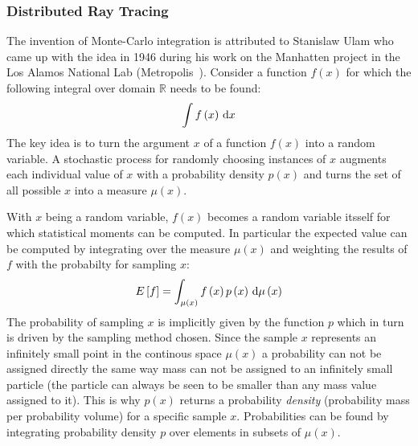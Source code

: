 \subsubsection*{Distributed Ray Tracing}

The invention of Monte-Carlo integration is attributed to Stanislaw Ulam who came up with the idea in 1946 during his work on the Manhatten project in the Los Alamos National Lab (Metropolis~\cite{Metropolis49, Metropolis87}). Consider a function $f\left(x\right)$ for which the following integral over domain $\mathbb{R}$ needs to be found:
\begin{align}
\int f\left(x\right)\,\mathrm{d} x
\label{eq:mc_integral_1}
\end{align}
The key idea is to turn the argument $x$ of a function $f(x)$ into a random variable. A stochastic process for randomly choosing instances of $x$ augments each individual value of $x$ with a probability density $p(x)$ and turns the set of all possible $x$ into a measure $\mu(x)$.

With $x$ being a random variable, $f\left(x\right)$ becomes a random variable itsself for which statistical moments can be computed. In particular the expected value can be computed by integrating over the measure $\mu(x)$ and weighting the results of $f$ with the probabilty for sampling $x$:
\begin{align}
E\left[f\right] = \int_{\mu\left(x\right)} f\left(x\right)p\left(x\right)\,\mathrm{d}\mu\left(x\right)
\end{align}
The probability of sampling $x$ is implicitly given by the function $p$ which in turn is driven by the sampling method chosen. Since the sample $x$ represents an infinitely small point in the continous space $\mu\left(x\right)$ a probability can not be assigned directly the same way mass can not be assigned to an infinitely small particle (the particle can always be seen to be smaller than any mass value assigned to it). This is why $p(x)$ returns a probability \emph{density} (probability mass per probability volume) for a specific sample $x$. Probabilities can be found by integrating probability density $p$ over elements in subsets of $\mu\left(x\right)$.

